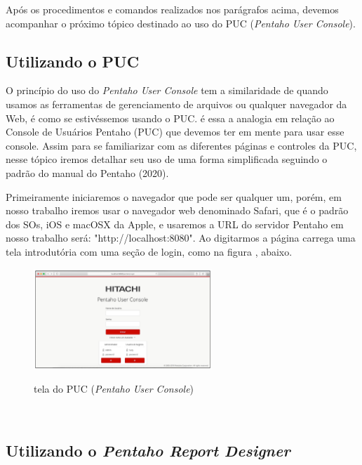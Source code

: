 Ap\'os os procedimentos e comandos realizados nos par\'{a}grafos acima, devemos acompanhar o pr\'oximo t\'opico destinado ao uso do PUC (\textit{Pentaho User Console}).


\subsection{Utilizando o PUC}

O princ\'{i}pio do uso do \textit{Pentaho User Console} tem a similaridade de quando usamos as ferramentas de gerenciamento de arquivos ou qualquer navegador da Web, \'{e} como se estiv\'{e}ssemos usando o PUC. \'{e} essa a analogia em rela\c{c}\~{a}o ao Console de Usu\'{a}rios Pentaho (PUC) que devemos ter em mente para usar esse console. Assim para se familiarizar com as diferentes p\'{a}ginas e controles da PUC, nesse t\'opico iremos detalhar seu uso de uma forma simplificada seguindo o padr\~{a}o do manual do Pentaho (2020).

Primeiramente iniciaremos o navegador que pode ser qualquer um, por\'{e}m, em nosso trabalho iremos usar o navegador web denominado Safari, que \'{e} o padr\~{a}o dos SOs, iOS e macOSX da Apple, e usaremos a URL do servidor Pentaho em nosso trabalho ser\'{a}: "http://localhost:8080".  Ao digitarmos a p\'{a}gina carrega uma tela introdut\'oria com uma se\c{c}\~{a}o de login, como na figura , abaixo.

\begin{figure}[H]
	\vspace*{0,2cm}
    \centering
    \caption{tela do PUC (\textit{Pentaho User Console})}
    \includegraphics[width=0.6\textwidth]{./04-figuras/figura-puc}
    \label{fig:ilustfigpuc}
\end{figure}
\vspace*{-0,9cm}
{\raggedright {}} \\


\subsection{Utilizando o \textit{Pentaho Report Designer}}

